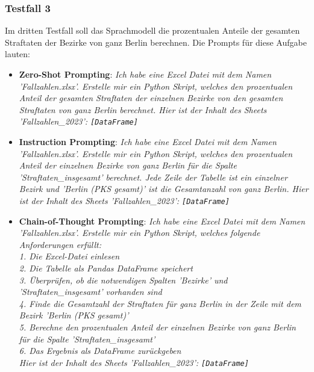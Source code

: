 \documentclass[11pt,a4paper]{article}
\begin{document}
\subsubsection{Testfall 3}
    Im dritten Testfall soll das Sprachmodell die prozentualen Anteile der gesamten Straftaten der Bezirke von ganz Berlin berechnen. Die Prompts für diese Aufgabe lauten:
    \begin{itemize}
        \item \textbf{Zero-Shot Prompting}: \emph{Ich habe eine Excel Datei mit dem Namen 'Fallzahlen.xlsx'. Erstelle mir ein Python Skript, welches den prozentualen Anteil der gesamten Straftaten der einzelnen Bezirke von den gesamten Straftaten von ganz Berlin berechnet. Hier ist der Inhalt des Sheets 'Fallzahlen\_2023': \texttt{[DataFrame]}}
        \item \textbf{Instruction Prompting}: \emph{Ich habe eine Excel Datei mit dem Namen 'Fallzahlen.xlsx'. Erstelle mir ein Python Skript, welches den prozentualen Anteil der einzelnen Bezirke von ganz Berlin für die Spalte 'Straftaten\_insgesamt' berechnet. Jede Zeile der Tabelle ist ein einzelner Bezirk und 'Berlin (PKS gesamt)' ist die Gesamtanzahl von ganz Berlin. Hier ist der Inhalt des Sheets 'Fallzahlen\_2023': \texttt{[DataFrame]}}
        \item \textbf{Chain-of-Thought Prompting}: \emph{Ich habe eine Excel Datei mit dem Namen 'Fallzahlen.xlsx'. Erstelle mir ein Python Skript, welches folgende Anforderungen erfüllt:\\ 1. Die Excel-Datei einlesen\\ 2. Die Tabelle als Pandas DataFrame speichert\\ 3. Überprüfen, ob die notwendigen Spalten 'Bezirke' und 'Straftaten\_insgesamt' vorhanden sind\\ 4. Finde die Gesamtzahl der Straftaten für ganz Berlin in der Zeile mit dem Bezirk 'Berlin (PKS gesamt)'\\ 5. Berechne den prozentualen Anteil der einzelnen Bezirke von ganz Berlin für die Spalte 'Straftaten\_insgesamt'\\ 6. Das Ergebnis als DataFrame zurückgeben\\ Hier ist der Inhalt des Sheets 'Fallzahlen\_2023': \texttt{[DataFrame]}}
    \end{itemize}
\end{document}
